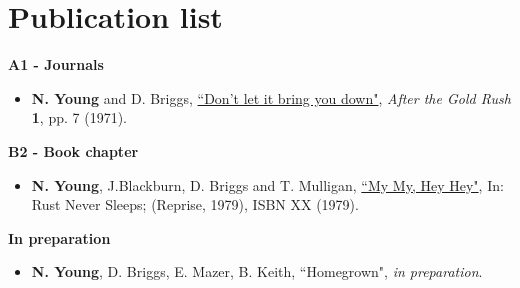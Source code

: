 \chapter*{Publication list} \label{chapter:publications}

\textbf{A1 - Journals}
\begin{itemize}

\item \textbf{N. Young} and D. Briggs, \href{https://www.youtube.com/watch?v=F7letrMf_nE}{``Don't let it bring you down"}, \textit{After the Gold Rush} \textbf{1}, pp. 7 (1971). 

\end{itemize}

\textbf{B2 - Book chapter}

\begin{itemize}

\item \textbf{N. Young}, J.Blackburn, D. Briggs and T. Mulligan, \href{https://www.youtube.com/watch?v=cawk2cMTnGo}{``My My, Hey Hey"}, In: Rust Never Sleeps; (Reprise, 1979), ISBN XX (1979).

\end{itemize}

\textbf{In preparation}

\begin{itemize}

\item \textbf{N. Young}, D. Briggs, E. Mazer, B. Keith, ``Homegrown", \textit{in preparation}.

\end{itemize}
